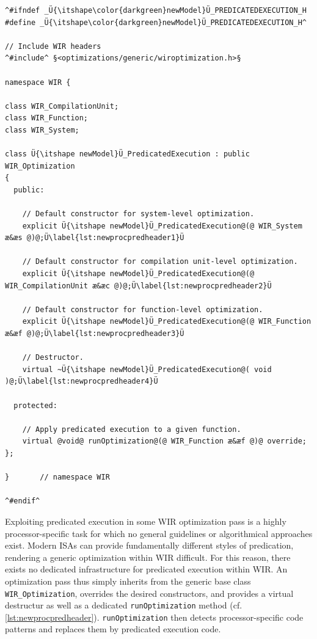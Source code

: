 \begin{lstlisting}[style=code,float=!t,caption={Header File for a New Processor Model's Predicated Execution Pass},label=lst:newprocpredheader]
^#ifndef _Ü{\itshape\color{darkgreen}newModel}Ü_PREDICATEDEXECUTION_H
#define _Ü{\itshape\color{darkgreen}newModel}Ü_PREDICATEDEXECUTION_H^

// Include WIR headers
^#include^ §<optimizations/generic/wiroptimization.h>§

namespace WIR {

class WIR_CompilationUnit;
class WIR_Function;
class WIR_System;

class Ü{\itshape newModel}Ü_PredicatedExecution : public WIR_Optimization
{
  public:

    // Default constructor for system-level optimization.
    explicit Ü{\itshape newModel}Ü_PredicatedExecution@(@ WIR_System æ&æs @)@;Ü\label{lst:newprocpredheader1}Ü

    // Default constructor for compilation unit-level optimization.
    explicit Ü{\itshape newModel}Ü_PredicatedExecution@(@ WIR_CompilationUnit æ&æc @)@;Ü\label{lst:newprocpredheader2}Ü

    // Default constructor for function-level optimization.
    explicit Ü{\itshape newModel}Ü_PredicatedExecution@(@ WIR_Function æ&æf @)@;Ü\label{lst:newprocpredheader3}Ü

    // Destructor.
    virtual ~Ü{\itshape newModel}Ü_PredicatedExecution@( void )@;Ü\label{lst:newprocpredheader4}Ü

  protected:

    // Apply predicated execution to a given function.
    virtual @void@ runOptimization@(@ WIR_Function æ&æf @)@ override;
};

}       // namespace WIR

^#endif^
\end{lstlisting}

Exploiting predicated execution in some \gls{WIR} optimization pass is a highly processor-specific task for which no general guidelines or algorithmical approaches exist.
Modern \glspl{ISA} can provide fundamentally different styles of predication, rendering a generic optimization within \gls{WIR} difficult.
For this reason, there exists no dedicated infrastructure for predicated execution within \gls{WIR}.
An optimization pass thus simply inherits from the generic base class \texttt{WIR\_Optimization}, overrides the desired constructors, and provides a virtual destructur as well as a dedicated \texttt{runOptimization} method (cf. \cref{lst:newprocpredheader}).
\texttt{runOptimization} then detects processor-specific code patterns and replaces them by predicated execution code.


